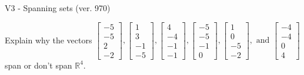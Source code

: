 \begin{exercise}
  \begin{exerciseTitle}V3 - Spanning sets (ver. 970)\end{exerciseTitle}
  \begin{exerciseStatement}
    Explain why the vectors \(\left[\begin{array}{r}
-5 \\
-5 \\
2 \\
-2
\end{array}\right] , \left[\begin{array}{r}
1 \\
3 \\
-1 \\
-5
\end{array}\right] , \left[\begin{array}{r}
4 \\
-4 \\
-1 \\
-1
\end{array}\right] , \left[\begin{array}{r}
-5 \\
-5 \\
-1 \\
0
\end{array}\right] , \left[\begin{array}{r}
1 \\
0 \\
-5 \\
-2
\end{array}\right] , \text{ and } \left[\begin{array}{r}
-4 \\
-4 \\
0 \\
4
\end{array}\right]\) span or don't span \(\mathbb{R}^4\). 
	



\end{exerciseStatement}
\end{exercise}
